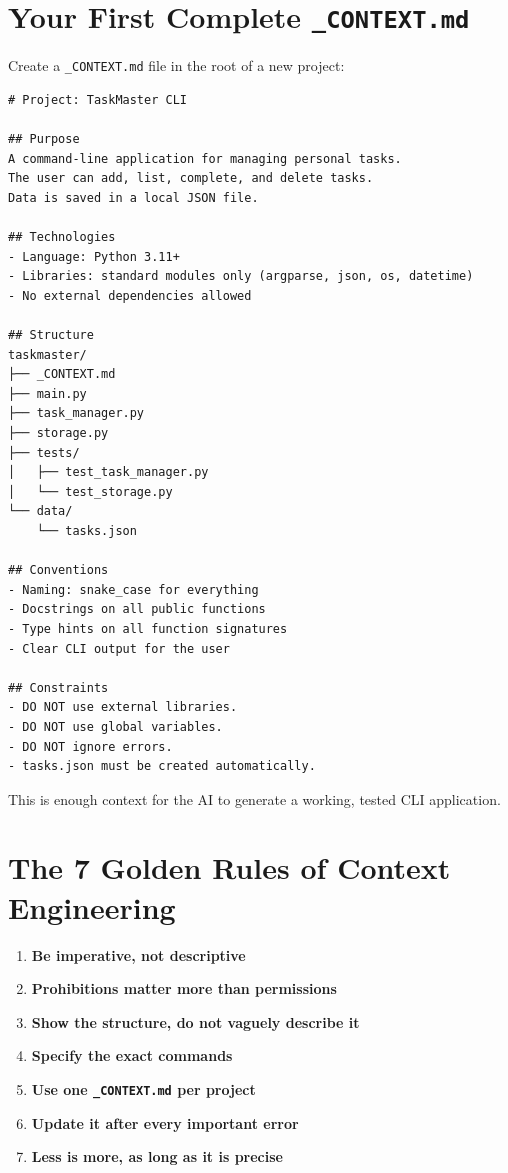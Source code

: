 \section{Your First Complete \texttt{\_CONTEXT.md}}

\begin{praticabox}[title={Hands-on --- Create your first context file}]
Create a \texttt{\_CONTEXT.md} file in the root of a new project:
\end{praticabox}

\begin{lstlisting}[language={},title={\texttt{\_CONTEXT.md} for TaskMaster CLI}]
# Project: TaskMaster CLI

## Purpose
A command-line application for managing personal tasks.
The user can add, list, complete, and delete tasks.
Data is saved in a local JSON file.

## Technologies
- Language: Python 3.11+
- Libraries: standard modules only (argparse, json, os, datetime)
- No external dependencies allowed

## Structure
taskmaster/
├── _CONTEXT.md
├── main.py
├── task_manager.py
├── storage.py
├── tests/
│   ├── test_task_manager.py
│   └── test_storage.py
└── data/
    └── tasks.json

## Conventions
- Naming: snake_case for everything
- Docstrings on all public functions
- Type hints on all function signatures
- Clear CLI output for the user

## Constraints
- DO NOT use external libraries.
- DO NOT use global variables.
- DO NOT ignore errors.
- tasks.json must be created automatically.
\end{lstlisting}

\begin{checkpointbox}
This is enough context for the AI to generate a working, tested CLI application.
\end{checkpointbox}

\section{The 7 Golden Rules of Context Engineering}

\begin{enumerate}
  \item \textbf{Be imperative, not descriptive}
  \item \textbf{Prohibitions matter more than permissions}
  \item \textbf{Show the structure, do not vaguely describe it}
  \item \textbf{Specify the exact commands}
  \item \textbf{Use one \texttt{\_CONTEXT.md} per project}
  \item \textbf{Update it after every important error}
  \item \textbf{Less is more, as long as it is precise}
\end{enumerate}

